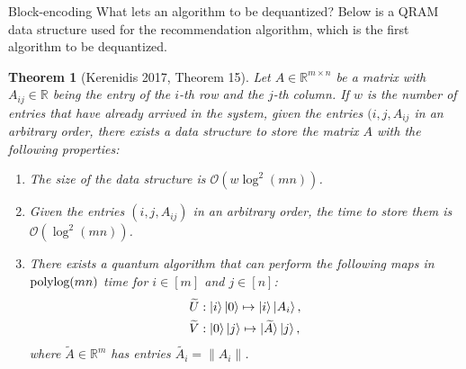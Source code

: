\documentclass[10pt,twoside,reqno]{amsart} %
\makeatletter
\renewcommand{\section}{\@startsection{section}{1}
   \z@{.7\linespacing\@plus\linespacing}{.5\linespacing}
   {\normalfont\upshape\bfseries\centering}}
\theoremstyle{plain}
\newtheorem{thm}{Theorem}[section]
\theoremstyle{definition}
\makeatother
\begin{document}
\section{Block-encoding}
What lets an algorithm to be dequantized? Below is a QRAM data structure used
for the recommendation algorithm, which is the first algorithm to be dequantized.
\begin{thm}[Kerenidis 2017, Theorem 15]
  Let $A\in\mathbb{R}^{m\times n}$ be a matrix with $A_{ij}\in\mathbb{R}$ being
  the entry of the $i$-th row and the $j$-th column. If $w$ is the number of
  entries that have already arrived in the system, given the entries $(i,j,A_{ij}$
  in an arbitrary order, there exists a data structure to store the matrix
  $A$ with the following properties:
  \begin{enumerate}
    \item The size of the data structure is $\mathcal{O}(w\log^2(mn))$.
    \item Given the entries $(i,j,A_{ij})$ in an arbitrary order, the time
      to store them is $\mathcal{O}(\log^2(mn))$.
    \item There exists a quantum algorithm that can perform the following maps
      in $\textrm{\normalfont polylog}(mn)$ time for $i\in[m]$ and $j\in[n]$:
      \begin{align*}
        \widetilde{U}&: \ket{i}\ket0\mapsto\ket{i}\ket{A_i},\\
        \widetilde{V}&: \ket0\ket{j}\mapsto\ket{\widetilde{A}}\ket{j},
      \end{align*}
      where $\widetilde{A}\in\mathbb{R}^m$ has entries $\widetilde{A_i}=\|A_i\|$.
  \end{enumerate}
\end{thm}
\end{document}
